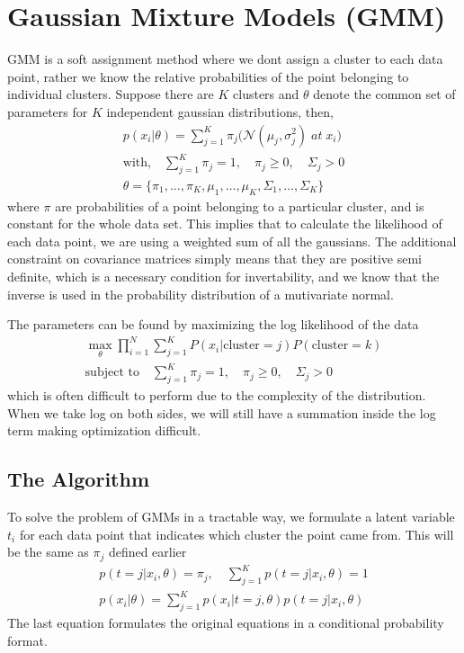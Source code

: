 \documentclass[../statistical_learning_notes.tex]{subfiles}
\begin{document}
    \section{Gaussian Mixture Models (GMM)}
    GMM is a soft assignment method where we dont assign a cluster to each data point, rather we know the relative probabilities of the point belonging to individual clusters. Suppose there are $K$ clusters and $\theta$ denote the common set of parameters for $K$ independent gaussian distributions, then,
    \begin{gather*}
        p(x_{i}|\theta) = \sum_{j=1}^{K} \pi_{j} \big( \mathcal{N}(\mu_{j}, \sigma_{j}^{2}) \; at \; x_{i} \big)\\
        \text{with,} \quad \sum_{j=1}^{K} \pi_{j} = 1, \quad \pi_{j} \geq 0, \quad \Sigma_{j} > 0\\
        \theta = \{ \pi_{1}, \ldots, \pi_{K}, \mu_{1}, \ldots, \mu_{K}, \Sigma_{1}, \ldots, \Sigma_{K} \}
    \end{gather*}
    where $\pi$ are probabilities of a point belonging to a particular cluster, and is constant for the whole data set. This implies that to calculate the likelihood of each data point, we are using a weighted sum of all the gaussians.\newline
    The additional constraint on covariance matrices simply means that they are positive semi definite, which is a necessary condition for invertability, and we know that the inverse is used in the probability distribution of a mutivariate normal.\newline

    The parameters can be found by maximizing the log likelihood of the data
    \begin{align*}
        \max_{\theta} \prod_{i=1}^{N}\sum_{j=1}^{K} P(x_{i}|\text{cluster} = j)P(\text{cluster} = k)\\
        \text{subject to} \quad \sum_{j=1}^{K} \pi_{j} = 1, \quad \pi_{j} \geq 0, \quad \Sigma_{j} > 0
    \end{align*}
    which is often difficult to perform due to the complexity of the distribution. When we take log on both sides, we will still have a summation inside the log term making optimization difficult.\newline

    
    \subsection{The Algorithm}
    To solve the problem of GMMs in a tractable way, we formulate a latent variable $t_{i}$ for each data point that indicates which cluster the point came from. This will be the same as $\pi_{j}$ defined earlier
    \begin{gather*}
        p(t = j|x_{i}, \theta) = \pi_{j}, \quad \sum_{j=1}^{K} p(t = j|x_{i}, \theta) = 1\\
        p(x_{i} | \theta) = \sum_{j=1}^{K} p(x_{i} | t = j, \theta) p(t = j|x_{i}, \theta)
    \end{gather*}
    The last equation formulates the original equations in a conditional probability format.\newline
\end{document}
